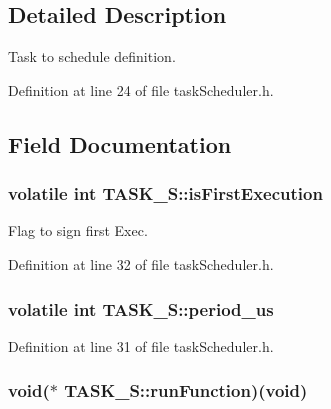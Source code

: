 \subsection{Detailed Description}
Task to schedule definition. 

Definition at line 24 of file task\-Scheduler.\-h.



\subsection{Field Documentation}
\hypertarget{structTASK__S_a4b50404ee955691f1c62845cdc9de676}{
\subsubsection[{is\-First\-Execution}]{\setlength{\rightskip}{0pt plus 5cm}volatile int T\-A\-S\-K\-\_\-\-S\-::is\-First\-Execution}}\label{structTASK__S_a4b50404ee955691f1c62845cdc9de676}


Flag to sign first Exec. 



Definition at line 32 of file task\-Scheduler.\-h.

\hypertarget{structTASK__S_aabd8f80831e6cfd8e51bbd371eed907b}{
\subsubsection[{period\-\_\-us}]{\setlength{\rightskip}{0pt plus 5cm}volatile int T\-A\-S\-K\-\_\-\-S\-::period\-\_\-us}}\label{structTASK__S_aabd8f80831e6cfd8e51bbd371eed907b}


Definition at line 31 of file task\-Scheduler.\-h.

\hypertarget{structTASK__S_a241d427891bed303812b78bd9f9ad86f}{
\subsubsection[{run\-Function}]{\setlength{\rightskip}{0pt plus 5cm}void($\ast$ T\-A\-S\-K\-\_\-\-S\-::run\-Function)(void)}}\label{structTASK__S_a241d427891bed303812b78bd9f9ad86f}


